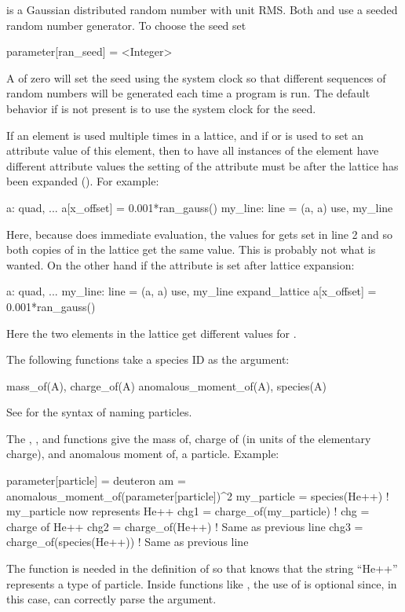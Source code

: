 {{{
 is a Gaussian distributed random number with unit RMS. 
Both  and  use a seeded random number generator. 
To choose the seed set 
\begin{example}
  parameter[ran_seed] = <Integer>
\end{example}
A  of zero will set the seed using the system clock so that
different sequences of random numbers will be generated each time a
program is run.  The default behavior if  is
not present is to use the system clock for the seed.

If an element is used multiple times in a lattice, and if  or
 is used to set an attribute value of this element, then
to have all instances of the element have different attribute values
the setting of the attribute must be after the lattice has been
expanded (). For example:
\begin{example}
  a: quad, ... 
  a[x_offset] = 0.001*ran_gauss()
  my_line: line = (a, a)
  use, my_line
\end{example}
Here, because \bmad does immediate evaluation, the 
values for  gets set in line 2 and so both copies of  in
the lattice get the same value. This is probably not what is wanted.
On the other hand if the attribute is set after lattice expansion:
\begin{example}
  a: quad, ...
  my_line: line = (a, a)
  use, my_line
  expand_lattice
  a[x_offset] = 0.001*ran_gauss()
\end{example}
Here the two  elements in the lattice get different values for
.

The following functions take a species ID as the argument:
\begin{example}
  mass_of(A),              charge_of(A)
  anomalous_moment_of(A),  species(A)
\end{example}
See  for the syntax of naming particles.

The , , and  functions give the mass of,
charge of (in units of the elementary charge), and anomalous moment of, a particle.
Example:
\begin{example}
  parameter[particle] = deuteron
  am = anomalous_moment_of(parameter[particle])^2
  my_particle = species(He++)      ! my_particle now represents He++
  chg1 = charge_of(my_particle)    ! chg = charge of He++
  chg2 = charge_of(He++)           ! Same as previous line
  chg3 = charge_of(species(He++))  ! Same as previous line
\end{example}
The  function is needed in the definition of  so that \bmad knows that
the string ``He++'' represents a type of particle. Inside functions like , the use of
 is optional since, in this case, \bmad can correctly parse the argument.

}}}
